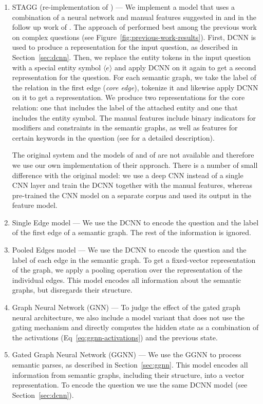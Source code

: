 \documentclass[11pt]{article}
\begin{document}
\begin{enumerate}
  \item STAGG (re-implementation of ) --- We implement a model that uses a combination of a neural network and manual features suggested in  and in the follow up work of . The approach of  performed best among the previous work on complex questions (see Figure~\ref{fig:previous-work-results}). First, DCNN is used to produce a representation for the input question, as described in Section~\ref{sec:dcnn}. Then, we replace the entity tokens in the input question with a special entity symbol $\langle e \rangle$  and apply DCNN on it again to get a second representation for the question. For each semantic graph, we take the label of the relation in the first edge (\textit{core edge}), tokenize it and likewise apply DCNN on it to get a representation. We produce two representations for the core relation: one that includes the label of the attached entity and one that includes the entity symbol. The manual features include binary indicators for modifiers and constraints in the semantic graphs, as well as features for certain keywords in the question (see  for a detailed description). 
  
The original system and the models of  and of  are not available and therefore we use our own implementation of their approach. There is a number of small difference with the original model: we use a deep CNN instead of a single CNN layer and train the DCNN together with the manual features, whereas  pre-trained the CNN model on a separate corpus and used its output in the feature model.

  \item Single Edge model --- We use the DCNN to encode the question and the label of the first edge of a semantic graph. The rest of the information is ignored.
  \item Pooled Edges model --- We use the DCNN to encode the question and the label of each edge in the semantic graph. To get a fixed-vector representation of the graph, we apply a pooling operation over the representation of the individual edges. This model encodes all information about the semantic graphs, but disregards their structure.
  \item Graph Neural Network (GNN) --- To judge the effect of the gated graph neural architecture, we also include a model variant that does not use the gating mechanism and directly computes the hidden state as a combination of the activations (Eq~\ref{eq:ggnn-activations}) and the previous state.
  \item Gated Graph Neural Network (GGNN) --- We use the GGNN to process semantic parses, as described in Section~\ref{sec:ggnn}. This model encodes all information from semantic graphs, including their structure, into a vector representation. To encode the question we use the same DCNN model (see Section~\ref{sec:dcnn}).
    
\end{enumerate}
\end{document}
